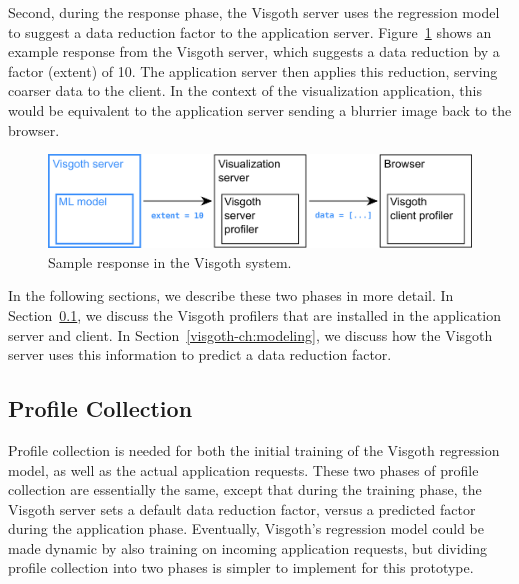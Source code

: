Second, during the response phase, the Visgoth server uses the regression model
to suggest a data reduction factor to the application server.
Figure~\ref{fig:system-response} shows an example response from the Visgoth
server, which suggests a data reduction by a factor (extent) of 10. The
application server then applies this reduction, serving coarser data to the
client. In the context of the visualization application, this would be
equivalent to the application server sending a blurrier image back to the
browser.\\

\begin{figure}[h]
\begin{center}
\includegraphics[scale=0.4]{./img/system-response.png}
\caption{Sample response in the Visgoth system.}
\label{fig:system-response}
\end{center}
\end{figure}

In the following sections, we describe these two phases in more detail. In
Section~\ref{visgoth-ch:profile-collection}, we discuss the Visgoth profilers that are
installed in the application server and client. In Section~\ref{visgoth-ch:modeling}, we
discuss how the Visgoth server uses this information to predict a data
reduction factor.\\

  \subsection{Profile Collection}\label{visgoth-ch:profile-collection}

  Profile collection is needed for both the initial training of the Visgoth
  regression model, as well as the actual application requests. These two
  phases of profile collection are essentially the same, except that during the
  training phase, the Visgoth server sets a default data reduction factor,
  versus a predicted factor during the application phase. Eventually, Visgoth's
  regression model could be made dynamic by also training on incoming
  application requests, but dividing profile collection into two phases is
  simpler to implement for this prototype.\\


